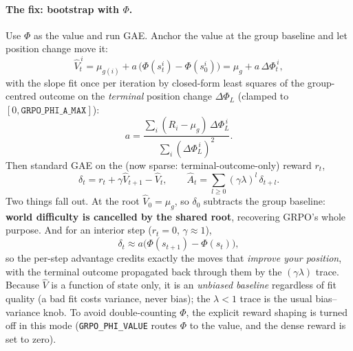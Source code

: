 \documentclass[11pt]{article}
\newcommand{\Adv}{\widehat{A}}
\newcommand{\cd}[1]{\texttt{#1}}
\begin{document}
\paragraph{The fix: bootstrap with $\Phi$.} Use $\Phi$ as the value and run GAE. Anchor the value at the
group baseline and let position change move it:
\begin{equation}
\widehat V_t^{\,i}=\mu_{g(i)}+a\,\big(\Phi(s^i_t)-\Phi(s^i_0)\big)=\mu_{g}+a\,\Delta\Phi_t^{\,i},
\label{eq:vhat}
\end{equation}
with the slope fit once per iteration by closed-form least squares of the group-centred outcome on the
\emph{terminal} position change $\Delta\Phi_L$ (clamped to $[0,\cd{GRPO\_PHI\_A\_MAX}]$):
\begin{equation}
a=\frac{\sum_i (R_i-\mu_{g})\,\Delta\Phi^{\,i}_{L}}{\sum_i(\Delta\Phi^{\,i}_{L})^2}.
\label{eq:phislope}
\end{equation}
Then standard GAE on the (now sparse: terminal-outcome-only) reward $r_t$,
\begin{equation}
\delta_t=r_t+\gamma\widehat V_{t+1}-\widehat V_t,\qquad
\Adv_t=\sum_{l\ge0}(\gamma\lambda)^l\,\delta_{t+l}.
\end{equation}
Two things fall out. At the root $\widehat V_0=\mu_g$, so $\delta_0$ subtracts the group baseline:
\textbf{world difficulty is cancelled by the shared root}, recovering GRPO's whole purpose. And for an
interior step ($r_t=0$, $\gamma\approx1$),
\begin{equation}
\delta_t\approx a\big(\Phi(s_{t+1})-\Phi(s_t)\big),
\end{equation}
so the per-step advantage credits exactly the moves that \emph{improve your position}, with the
terminal outcome propagated back through them by the $(\gamma\lambda)$ trace. Because $\widehat V$ is a
function of state only, it is an \emph{unbiased baseline} regardless of fit quality (a bad fit costs
variance, never bias); the $\lambda<1$ trace is the usual bias--variance knob. To avoid double-counting
$\Phi$, the explicit reward shaping is turned off in this mode (\cd{GRPO\_PHI\_VALUE} routes $\Phi$ to
the value, and the dense reward is set to zero).

\end{document}
